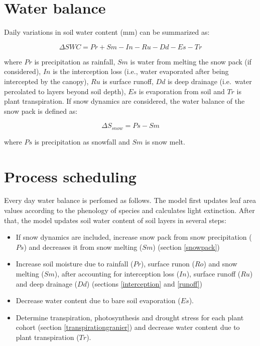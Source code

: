 \documentclass[]{book}
\providecommand{\tightlist}{%
  \setlength{\itemsep}{0pt}\setlength{\parskip}{0pt}}
\begin{document}
\hypertarget{water-balance}{%
\section{Water balance}\label{water-balance}}

Daily variations in soil water content (mm) can be summarized as:

\begin{equation}
\Delta{SWC} = Pr + Sm - In - Ru - Dd - Es -Tr
\end{equation}

where \(Pr\) is precipitation as rainfall, \(Sm\) is water from melting the snow pack (if considered), \(In\) is the interception loss (i.e., water evaporated after being intercepted by the canopy), \(Ru\) is surface runoff, \(Dd\) is deep drainage (i.e.~water percolated to layers beyond soil depth), \(Es\) is evaporation from soil and \(Tr\) is plant transpiration. If snow dynamics are considered, the water balance of the snow pack is defined as:

\begin{equation}
\Delta{S_{snow}} = Ps - Sm
\end{equation}

where \(Ps\) is precipitation as snowfall and \(Sm\) is snow melt.

\hypertarget{process-scheduling}{%
\section{Process scheduling}\label{process-scheduling}}

Every day water balance is perfomed as follows. The model first updates leaf area values according to the phenology of species and calculates light extinction. After that, the model updates soil water content of soil layers in several steps:

\begin{itemize}
\tightlist
\item
  If snow dynamics are included, increase snow pack from snow precipitation (\(Ps\)) and decreases it from snow melting (\(Sm\)) (section \ref{snowpack})
\item
  Increase soil moisture due to rainfall (\(Pr\)), surface runon (\(Ro\)) and snow melting (\(Sm\)), after accounting for interception loss (\(In\)), surface runoff (\(Ru\)) and deep drainage (\(Dd\)) (sections \ref{interception} and \ref{runoff})
\item
  Decrease water content due to bare soil evaporation (\(Es\)).
\item
  Determine transpiration, photosynthesis and drought stress for each plant cohort (section \ref{transpirationgranier}) and decrease water content due to plant transpiration (\(Tr\)).
\end{itemize}
\end{document}

